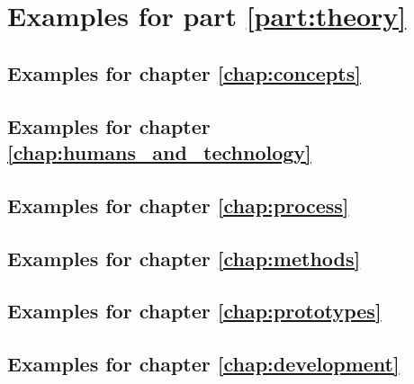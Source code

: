 \chapter{Examples for part \ref{part:theory}} \label{chap:theory_examples}
\minitoc \newpage

\section{Examples for chapter \ref{chap:concepts}} \label{chap:concepts_examples}

\section{Examples for chapter \ref{chap:humans_and_technology}} \label{chap:humans_and_technology_examples}

\section{Examples for chapter \ref{chap:process}} \label{chap:process_examples}

\section{Examples for chapter \ref{chap:methods}} \label{chap:methods_examples}

\section{Examples for chapter \ref{chap:prototypes}} \label{chap:prototypes_examples}

\section{Examples for chapter \ref{chap:development}} \label{chap:development_examples}



